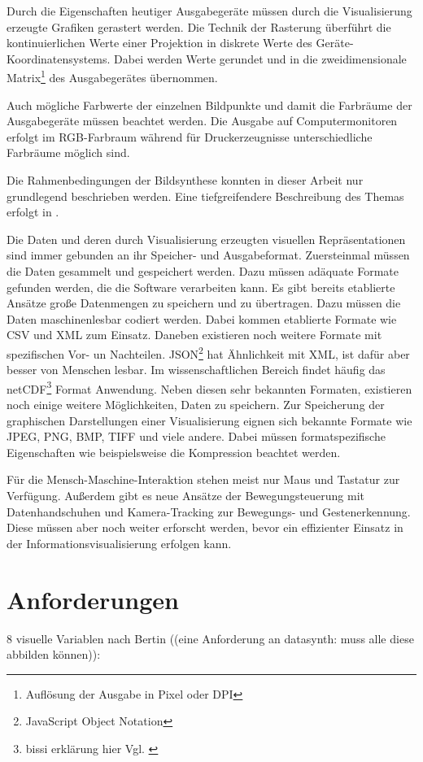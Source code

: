 \documentclass[a4paper, 12pt, DIVcalc, onepage, pdftex, headsepline, footsepline]{scrreprt}
\begin{document}
Durch die Eigenschaften heutiger Ausgabegeräte müssen durch die Visualisierung erzeugte
Grafiken gerastert werden. Die Technik der Rasterung überführt die kontinuierlichen Werte
einer Projektion in diskrete Werte des Geräte-Koordinatensystems. Dabei werden Werte
gerundet und in die zweidimensionale Matrix\footnote{Auflösung der Ausgabe in Pixel oder DPI}
des Ausgabegerätes übernommen.

Auch mögliche Farbwerte der einzelnen Bildpunkte und damit die Farbräume der Ausgabegeräte
müssen beachtet werden. Die Ausgabe auf Computermonitoren erfolgt im RGB-Farbraum während
für Druckerzeugnisse unterschiedliche Farbräume möglich sind.

Die Rahmenbedingungen der Bildsynthese konnten in dieser Arbeit nur grundlegend beschrieben
werden. Eine tiefgreifendere Beschreibung des Themas erfolgt in \citep{Computergrafik}.


Die Daten und deren durch Visualisierung erzeugten visuellen Repräsentationen sind immer
gebunden an ihr Speicher- und Ausgabeformat.
Zuersteinmal müssen die Daten gesammelt und gespeichert werden. Dazu müssen adäquate
Formate gefunden werden, die die Software verarbeiten kann. Es gibt bereits
etablierte Ansätze große Datenmengen zu speichern und zu übertragen. Dazu müssen
die Daten maschinenlesbar codiert werden. Dabei kommen etablierte Formate wie
CSV und XML zum Einsatz. Daneben existieren noch weitere Formate mit spezifischen
Vor- un Nachteilen. JSON\footnote{JavaScript Object Notation} hat Ähnlichkeit mit XML,
ist dafür aber besser von Menschen lesbar. Im wissenschaftlichen Bereich findet
häufig das netCDF\footnote{bissi erklärung hier Vgl. \citep{Schumann}} Format
Anwendung. Neben diesen sehr bekannten Formaten, existieren noch einige weitere
Möglichkeiten, Daten zu speichern.
Zur Speicherung der graphischen Darstellungen einer Visualisierung eignen sich bekannte
Formate wie JPEG, PNG, BMP, TIFF und viele andere. Dabei müssen formatspezifische
Eigenschaften wie beispielsweise die Kompression beachtet werden.


Für die Mensch-Maschine-Interaktion stehen meist nur Maus und Tastatur zur Verfügung.
Außerdem gibt es neue Ansätze der Bewegungsteuerung mit Datenhandschuhen und
Kamera-Tracking zur Bewegungs- und Gestenerkennung. Diese müssen aber noch weiter
erforscht werden, bevor ein effizienter Einsatz in der Informationsvisualisierung
erfolgen kann.

\section{Anforderungen}
\label{sec:Anforderungen}
8 visuelle Variablen nach Bertin ((eine Anforderung an datasynth: muss alle diese abbilden können)):
\end{document}
